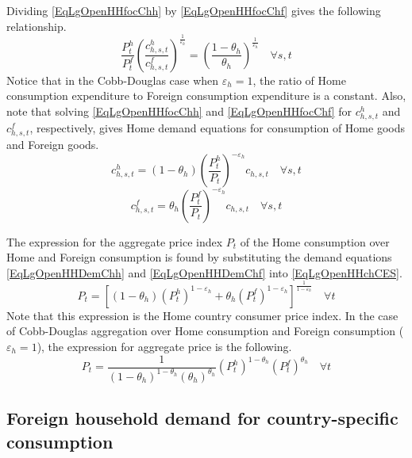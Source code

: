 \documentclass[letterpaper,12pt]{article}
\theoremstyle{definition}
\newcommand\ve{\varepsilon}
\begin{document}
    Dividing \eqref{EqLgOpenHHfocChh} by \eqref{EqLgOpenHHfocChf} gives the following relationship.
    \begin{equation}\label{EqLgOpenHHFracExpDomFor}
      \frac{ P^h_t}{P^f_t}\left(\frac{c^h_{h,s,t}}{c^f_{h,s,t}}\right)^{\frac{1}{\ve_h}} = \left(\frac{1-\theta_h}{\theta_h}\right)^{\frac{1}{\ve_h}} \quad\forall s,t
    \end{equation}
    Notice that in the Cobb-Douglas case when $\ve_h=1$, the ratio of Home consumption expenditure to Foreign consumption expenditure is a constant. Also, note that solving \eqref{EqLgOpenHHfocChh} and \eqref{EqLgOpenHHfocChf} for $c^h_{h,s,t}$ and $c^f_{h,s,t}$, respectively, gives Home demand equations for consumption of Home goods and Foreign goods.
    \begin{equation}\label{EqLgOpenHHDemChh}
          c^h_{h,s,t} = (1-\theta_h)\left(\frac{P^h_t}{P_t}\right)^{-\ve_h}c_{h,s,t} \quad\forall s,t
    \end{equation}
    \begin{equation}\label{EqLgOpenHHDemChf}
          c^f_{h,s,t} = \theta_h \left(\frac{P^f_t}{P_t}\right)^{-\ve_h}c_{h,s,t} \quad\forall s,t
    \end{equation}

    The expression for the aggregate price index $P_t$ of the Home consumption over Home and Foreign consumption is found by substituting the demand equations \eqref{EqLgOpenHHDemChh} and \eqref{EqLgOpenHHDemChf} into \eqref{EqLgOpenHHchCES}.
    \begin{equation}\label{EqLgOpenHHaggPr}
      P_t = \left[(1-\theta_h)\left(P^h_t\right)^{1-\ve_h} + \theta_h (P^f_t)^{1-\ve_h}\right]^{\frac{1}{1-\ve_h}} \quad\forall t
    \end{equation}
    Note that this expression is the Home country consumer price index. In the case of Cobb-Douglas aggregation over Home consumption and Foreign consumption ($\ve_h=1$), the expression for aggregate price is the following.
    \begin{equation}\label{EqLgOpenHHaggPrCobb}
      P_t = \frac{1}{(1-\theta_h)^{1-\theta_h}(\theta_h)^{\theta_h}} \left(P^h_t\right)^{1-\theta_h}(P^f_t)^{\theta_h} \quad\forall t
    \end{equation}

  \subsection{Foreign household demand for country-specific consumption}\label{SecLgOpenHHforSpec}
\end{document}
